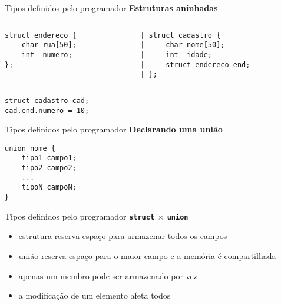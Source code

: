 \documentclass[10pt]{beamer}
\begin{document}
\begin{frame}[fragile]{Tipos definidos pelo programador}
    \huge
    \textbf{Estruturas aninhadas}

    \large
    \begin{columns}
    \begin{column}{0.35\textwidth}
        \begin{verbatim}
struct endereco {
    char rua[50];
    int  numero;
};

        \end{verbatim}
    \end{column}
    \begin{column}{0.55\textwidth}
        \begin{verbatim}
| struct cadastro {
|     char nome[50];
|     int  idade;
|     struct endereco end;
| };
        \end{verbatim}
    \end{column}
    \end{columns}

    \begin{verbatim}
struct cadastro cad;
cad.end.numero = 10;
    \end{verbatim}
    
\end{frame}

\begin{frame}[fragile]{Tipos definidos pelo programador}
    \huge
    \textbf{Declarando uma união}
    
    \Large
    \begin{verbatim}
union nome {
    tipo1 campo1;
    tipo2 campo2;
    ...
    tipoN campoN;
}
    \end{verbatim}
\end{frame}

\begin{frame}[fragile]{Tipos definidos pelo programador}
    \huge
    \textbf{\texttt{struct} $\times$ \texttt{union}}
    
    \vfill
    
    \large
    \setlength{\leftmargini}{0pt}
    \begin{itemize}
        \item [] estrutura reserva espaço para armazenar todos os campos
        \item [] união reserva espaço para o maior campo e a memória é compartilhada
        \item [] apenas um membro pode ser armazenado por vez
        \item [] a modificação de um elemento afeta todos
    \end{itemize}
    
\end{frame}
\end{document}

